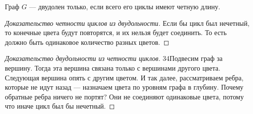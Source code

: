 \documentclass[russian]{lecture-notes}
\begin{document}
	\begin{theorem}
		Граф $G$ --- двудолен только, если всего его циклы имеют четную длину.
	\end{theorem}
	
	\begin{proof}[Доказательство четности циклов из двудольности]
		Если бы цикл был нечетный, то конечные цвета будут повторятся, и их нельзя будет соединить. То есть должно быть одинаковое количество разных цветов.
	\end{proof}
	
	\begin{proof}[Доказательство двудольности из четности циклов]
		\char34Подвесим граф за вершину. Тогда эта вершина связана только с вершинами другого цвета. Следующая вершина опять с другим цветом. И так далее, рассматриваем ребра, которые не идут назад --- назначаем цвета по уровням графа в глубину. Почему обратные ребра ничего не портят? Они не соединяют одинаковые цвета, потому что иначе цикл был бы нечетный.
	\end{proof}
\end{document}

